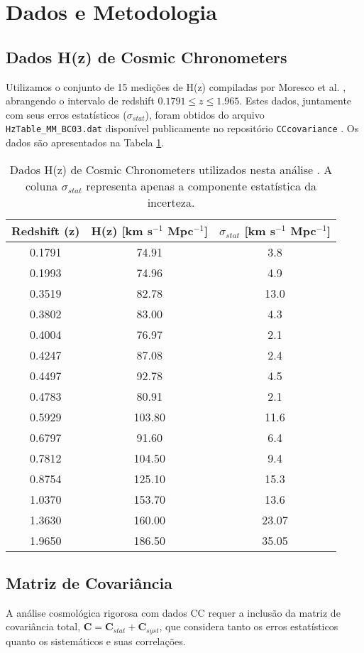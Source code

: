 \documentclass[11pt,a4paper]{article}
\begin{document}
\section{Dados e Metodologia}

\subsection{Dados H(z) de Cosmic Chronometers}
Utilizamos o conjunto de 15 medições de H(z) compiladas por Moresco et al. \cite{ref:moresco_data}, abrangendo o intervalo de redshift $0.1791 \le z \le 1.965$. Estes dados, juntamente com seus erros estatísticos ($\sigma_{stat}$), foram obtidos do arquivo \texttt{HzTable\_MM\_BC03.dat} disponível publicamente no repositório \texttt{CCcovariance} \cite{ref:cc_repo}. Os dados são apresentados na Tabela \ref{tab:hz_data}.

\begin{table}[htbp]
\centering
\caption{Dados H(z) de Cosmic Chronometers utilizados nesta análise \cite{ref:moresco_data}. A coluna $\sigma_{stat}$ representa apenas a componente estatística da incerteza.}
\label{tab:hz_data}
\begin{tabular}{ccc}
\toprule
Redshift (z) & H(z) [km s$^{-1}$ Mpc$^{-1}$] & $\sigma_{stat}$ [km s$^{-1}$ Mpc$^{-1}$] \\
\midrule
0.1791 & 74.91 & 3.8 \\
0.1993 & 74.96 & 4.9 \\
0.3519 & 82.78 & 13.0 \\
0.3802 & 83.00 & 4.3 \\
0.4004 & 76.97 & 2.1 \\
0.4247 & 87.08 & 2.4 \\
0.4497 & 92.78 & 4.5 \\
0.4783 & 80.91 & 2.1 \\
0.5929 & 103.80 & 11.6 \\
0.6797 & 91.60 & 6.4 \\
0.7812 & 104.50 & 9.4 \\
0.8754 & 125.10 & 15.3 \\
1.0370 & 153.70 & 13.6 \\
1.3630 & 160.00 & 23.07 \\
1.9650 & 186.50 & 35.05 \\
\bottomrule
\end{tabular}
\end{table}


\subsection{Matriz de Covariância}
A análise cosmológica rigorosa com dados CC requer a inclusão da matriz de covariância total, $\mathbf{C} = \mathbf{C}_{stat} + \mathbf{C}_{syst}$, que considera tanto os erros estatísticos quanto os sistemáticos e suas correlações.
\end{document}
